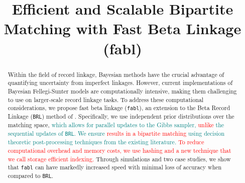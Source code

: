 \documentclass[ba]{imsart}
\begin{document}
\linenumbers
\begin{frontmatter}
\title{Efficient and Scalable Bipartite Matching with Fast Beta Linkage  (fabl)}


\begin{abstract} 
Within the field of record linkage, Bayesian methods have the crucial advantage of quantifying uncertainty from imperfect linkages. However, current implementations of Bayesian Fellegi-Sunter models are computationally intensive, making them challenging to use on larger-scale record linkage tasks. To address these computational considerations, we propose fast beta linkage (\texttt{fabl}), an extension to the Beta Record Linkage (\texttt{BRL}) method of \cite{sadinle_bayesian_2017}. Specifically, we use independent prior distributions over the matching space, \textcolor{teal}{which allows for parallel updates to the Gibbs sampler, \textcolor{red}{unlike} the sequential updates of \texttt{BRL}.}
\textcolor{teal}{We ensure \textcolor{red}{ results in a bipartite matching} using decision theoretic post-processing techniques from the existing literature.}
\textcolor{red}{To reduce computational overhead and memory costs, we use hashing and a new technique that we call storage efficient indexing. }
Through simulations and two case studies, we show that \texttt{fabl} can have markedly increased speed with minimal loss of accuracy when compared to \texttt{BRL}.
\end{abstract}



\end{frontmatter}
\end{document}
